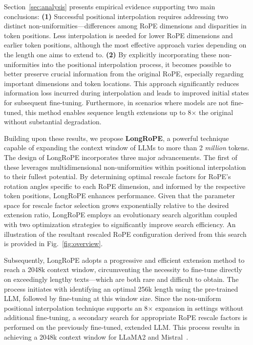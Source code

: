 Section~\ref{sec:analysis} presents empirical evidence supporting two main conclusions: \textbf{(1)} Successful positional interpolation requires addressing two distinct non-uniformities—differences among RoPE dimensions and disparities in token positions. Less interpolation is needed for lower RoPE dimensions and earlier token positions, although the most effective approach varies depending on the length one aims to extend to. \textbf{(2)} By explicitly incorporating these non-uniformities into the positional interpolation process, it becomes possible to better preserve crucial information from the original RoPE, especially regarding important dimensions and token locations. This approach significantly reduces information loss incurred during interpolation and leads to improved initial states for subsequent fine-tuning. Furthermore, in scenarios where models are not fine-tuned, this method enables sequence length extensions up to 8$\times$ the original without substantial degradation.

Building upon these results, we propose \textbf{LongRoPE}, a powerful technique capable of expanding the context window of LLMs to more than 2 \emph{million} tokens. The design of LongRoPE incorporates three major advancements. The first of these leverages multidimensional non-uniformities within positional interpolation to their fullest potential. By determining optimal rescale factors for RoPE's rotation angles specific to each RoPE dimension, and informed by the respective token positions, LongRoPE enhances performance. Given that the parameter space for rescale factor selection grows exponentially relative to the desired extension ratio, LongRoPE employs an evolutionary search algorithm coupled with two optimization strategies to significantly improve search efficiency. An illustration of the resultant rescaled RoPE configuration derived from this search is provided in Fig.~\ref{fig:overview}.

Subsequently, {LongRoPE} adopts a progressive and efficient extension method to reach a 2048k context window, circumventing the necessity to fine-tune directly on exceedingly lengthy texts—which are both rare and difficult to obtain. The process initiates with identifying an optimal 256k length using the pre-trained LLM, followed by fine-tuning at this window size. Since the non-uniform positional interpolation technique supports an 8$\times$ expansion in settings without additional fine-tuning, a secondary search for appropriate RoPE rescale factors is performed on the previously fine-tuned, extended LLM. This process results in achieving a 2048k context window for LLaMA2 and Mistral~\cite{mistral}.

